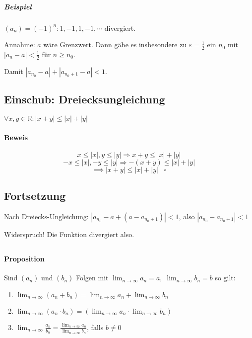 \documentclass[14pt,a4paper]{article}
\begin{document}
    \subparagraph{Beispiel}
    $ (a_n) = (-1)^{n} : 1, -1, 1, -1, \dotsb $ divergiert.

    Annahme: $a$ wäre Grenzwert. Dann gäbe es insbesondere zu $ \varepsilon =
    \frac{1}{2} $ ein $n_0$ mit $ |a_n - a| < \frac{1}{2} $ für $ n \geq n_0$.

    Damit $ | a_{n_0} - a | + | a_{n_0 + 1} - a | < 1 $.

    \subsection{Einschub: Dreiecksungleichung}
    $ \forall x,y \in \mathbb{R} : |x+y| \leq |x| + |y| $

    \paragraph{Beweis}
    $$  x \leq |x| ,  y \leq |y| \Rightarrow   x+y  \leq |x| + |y| $$
    $$ -x \leq |x| , -y \leq |y| \Rightarrow -(x+y) \leq |x| + |y| $$
    $$ \implies |x+y| \leq |x| + |y| \;\;\;\square $$

    \subsection*{Fortsetzung}
    Nach Dreiecks-Ungleichung: $ | a_{n_0} - a + (a - a_{n_0 + 1}) | < 1 $, also
    $ | a_{n_0} - a_{n_0 + 1} | < 1 $

    Widerspruch! Die Funktion divergiert also.

    \subsection{}
    \paragraph{Proposition}
    Sind $(a_n)$ und $(b_n)$ Folgen mit $ \lim_{n \to \infty}a_n = a,\; \lim_{n
      \to \infty}b_n = b $ so gilt:

    \begin{enumerate}
      \item $ \lim_{n\to\infty}(a_n + b_n) = \lim_{n \to\infty} a_n +
        \lim_{n\to\infty} b_n $
      \item $ \lim_{n\to\infty} (a_n \cdot b_n) = ( \lim_{n \to\infty} a_n \cdot
          \lim_{n\to\infty} b_n ) $
      \item $ \lim_{n\to\infty} \frac{a_n}{b_n} = \frac{\lim_{n\to\infty}
          a_n}{\lim_{n\to\infty} b_n}$, falls $ b \neq 0$
    \end{enumerate}
\end{document}
